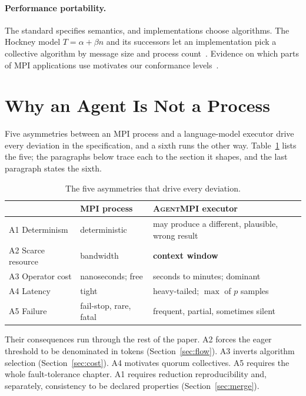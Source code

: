 \documentclass[sigconf,nonacm]{acmart}
\newcommand{\ampi}{\textsc{AgentMPI}\xspace}
\begin{document}
\paragraph{Performance portability.} The standard specifies semantics, and
implementations choose algorithms. The Hockney model $T = \alpha + \beta n$ and
its successors let an implementation pick a collective algorithm by message size
and process
count~\cite{culler1993logp,alexandrov1995loggp,thakur2005optimization,rabenseifner2004optimization}.
Evidence on which parts of MPI applications use motivates our conformance
levels~\cite{laguna2019study}.

\section{Why an Agent Is Not a Process}
\label{sec:asym}

Five asymmetries between an MPI process and a language-model executor drive
every deviation in the specification, and a sixth runs the other way.
Table~\ref{tab:asym} lists the five; the paragraphs below trace each to the
section it shapes, and the last paragraph states the sixth.

\begin{table}[t]
\caption{The five asymmetries that drive every deviation.}
\label{tab:asym}
\small
\begin{tabular}{@{}llp{2.6cm}@{}}
\toprule
 & MPI process & \ampi executor \\
\midrule
A1 Determinism & deterministic & may produce a different, plausible, wrong result \\
A2 Scarce resource & bandwidth & \textbf{context window} \\
A3 Operator cost & nanoseconds; free & seconds to minutes; dominant \\
A4 Latency & tight & heavy-tailed; $\max$ of $p$ samples \\
A5 Failure & fail-stop, rare, fatal & frequent, partial, sometimes silent \\
\bottomrule
\end{tabular}
\end{table}

Their consequences run through the rest of the paper. A2 forces the eager
threshold to be denominated in tokens (Section~\ref{sec:flow}). A3 inverts
algorithm selection (Section~\ref{sec:cost}). A4 motivates quorum collectives.
A5 requires the whole fault-tolerance chapter. A1 requires reduction
reproducibility and, separately, consistency to be declared properties
(Section~\ref{sec:merge}).
\end{document}
